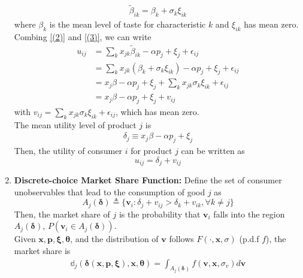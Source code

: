 \documentclass[11pt]{elegantbook}
\begin{document}
\begin{enumerate}
    \begin{equation}
        \begin{aligned}
            \tilde{\beta}_{ik}=\beta_k+\sigma_k\xi_{ik}
        \end{aligned}
        \tag{(3)}
        \label{(3)}
    \end{equation}
    where $\beta_k$ is the mean level of taste for characteristic $k$ and $\xi_{ik}$ has mean zero.\\
    Combing \ref{(2)} and \ref{(3)}, we can write
    \begin{equation}
        \begin{aligned}
            u_{ij}&=\sum_{k}x_{jk}\tilde{\beta}_{ik}-\alpha p_j+\xi_j+\epsilon_{ij}\\
            &=\sum_{k}x_{jk}\left(\beta_k+\sigma_k\xi_{ik}\right)-\alpha p_j+\xi_j+\epsilon_{ij}\\
            &=x_j\beta-\alpha p_j+\xi_j+\sum_{k}x_{jk}\sigma_k\xi_{ik}+\epsilon_{ij}\\
            &=x_j\beta-\alpha p_j+\xi_j+v_{ij}
        \end{aligned}
        \nonumber
    \end{equation}
    with $v_{ij}=\sum_{k}x_{jk}\sigma_k\xi_{ik}+\epsilon_{ij}$, which has mean zero.\\
    The mean utility level of product $j$ is
    \begin{equation}
        \begin{aligned}
            \delta_j\equiv x_j\beta-\alpha p_j+\xi_j
        \end{aligned}
        \tag{(5)}
        \label{(5)}
    \end{equation}
    Then, the utility of consumer $i$ for product $j$ can be written as $$u_{ij}=\delta_j+v_{ij}$$
    \item \textbf{Discrete-choice Market Share Function:}
    \subitem Define the set of consumer unobservables that lead to the consumption of good $j$ as $$A_j(\boldsymbol{\delta})\triangleq \{\boldsymbol{v}_i: \delta_j+v_{ij}>\delta_k+v_{ik}, \forall k\neq j\}$$
    Then, the market share of $j$ is the probability that $\boldsymbol{v}_i$ falls into the region $A_j(\boldsymbol{\delta})$, $P(\boldsymbol{v}_i\in A_j(\boldsymbol{\delta}))$.\\
    Given $\boldsymbol{x},\boldsymbol{p},\boldsymbol{\xi}, \boldsymbol{\theta}$, and the distribution of $\boldsymbol{v}$ follows $F(\cdot,\boldsymbol{x},\sigma)$ (p.d.f $f$), the market share is
    \begin{equation}
        \begin{aligned}
            \mathbb{d}_j(\boldsymbol{\delta}(\boldsymbol{x},\boldsymbol{p},\boldsymbol{\xi}),\boldsymbol{x},\boldsymbol{\theta})=\int_{A_j(\boldsymbol{\delta})}f(\boldsymbol{v},\boldsymbol{x},\sigma_v)d \boldsymbol{v}
        \end{aligned}
        \nonumber
    \end{equation}
\end{enumerate}
\end{document}

